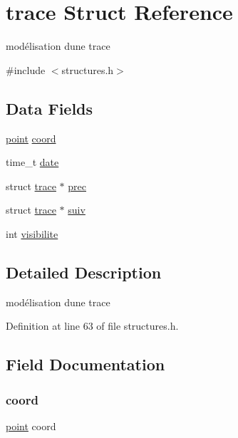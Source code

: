 \hypertarget{structtrace}{}\section{trace Struct Reference}
\label{structtrace}


modélisation d\textquotesingle{}une trace  




{\ttfamily \#include $<$structures.\+h$>$}

\subsection*{Data Fields}
\begin{DoxyCompactItemize}
\item 
\hyperlink{structpoint}{point} \hyperlink{structtrace_a16be187ac405f3bb61930a342b444253}{coord}
\item 
time\+\_\+t \hyperlink{structtrace_afd1d5f3476eea5753c7c59bfa90777ba}{date}
\item 
struct \hyperlink{structtrace}{trace} $\ast$ \hyperlink{structtrace_a1967dba5ed4900e2f554b2442863e69e}{prec}
\item 
struct \hyperlink{structtrace}{trace} $\ast$ \hyperlink{structtrace_ab7909a2cccd6f40ca9499c850c9c948c}{suiv}
\item 
int \hyperlink{structtrace_aa34b47a3ed3a7dfed8a672132bcc3f2a}{visibilite}
\end{DoxyCompactItemize}


\subsection{Detailed Description}
modélisation d\textquotesingle{}une trace 

Definition at line 63 of file structures.\+h.



\subsection{Field Documentation}
\hypertarget{structtrace_a16be187ac405f3bb61930a342b444253}{}\label{structtrace_a16be187ac405f3bb61930a342b444253} 
\subsubsection{\texorpdfstring{coord}{coord}}
{\footnotesize\ttfamily \hyperlink{structpoint}{point} coord}

